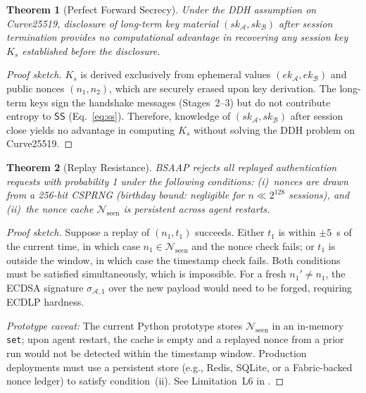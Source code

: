 \documentclass[review,5p,twocolumn,times]{elsarticle}
\newtheorem{theorem}{Theorem}[section]
\begin{document}
\begin{theorem}[Perfect Forward Secrecy]\label{thm:pfs}
Under the DDH assumption on Curve25519, disclosure of long-term key material
$(sk_\mathcal{A}, sk_\mathcal{B})$ after session termination provides no
computational advantage in recovering any session key $K_s$ established
before the disclosure.
\end{theorem}

\begin{proof}[Proof sketch]
$K_s$ is derived exclusively from ephemeral values $(ek_\mathcal{A},
ek_\mathcal{B})$ and public nonces $(n_1, n_2)$, which are securely erased
upon key derivation. The long-term keys sign the handshake messages
(Stages~2--3) but do not contribute entropy to $\mathsf{SS}$
(Eq.~\ref{eq:ss}). Therefore, knowledge of $(sk_\mathcal{A}, sk_\mathcal{B})$
after session close yields no advantage in computing $K_s$ without solving
the DDH problem on Curve25519.
\end{proof}

\begin{theorem}[Replay Resistance]\label{thm:replay}
BSAAP rejects all replayed authentication requests with probability 1 under
the following conditions: \emph{(i)}~nonces are drawn from a 256-bit CSPRNG
(birthday bound: negligible for $n \ll 2^{128}$ sessions), and
\emph{(ii)}~the nonce cache $\mathcal{N}_{\mathrm{seen}}$ is persistent
across agent restarts.
\end{theorem}

\begin{proof}[Proof sketch]
Suppose a replay of $(n_1, t_1)$ succeeds. Either $t_1$ is within
$\pm 5$~s of the current time, in which case
$n_1 \in \mathcal{N}_{\mathrm{seen}}$ and the nonce check fails;
or $t_1$ is outside the window, in which case the timestamp check fails.
Both conditions must be satisfied simultaneously, which is impossible.
For a fresh $n_1' \neq n_1$, the ECDSA signature $\sigma_{\mathcal{A},1}$
over the new payload would need to be forged, requiring ECDLP hardness.

\emph{Prototype caveat:} The current Python prototype stores
$\mathcal{N}_{\mathrm{seen}}$ in an in-memory \texttt{set}; upon agent
restart, the cache is empty and a replayed nonce from a prior run would
not be detected within the timestamp window. Production deployments must
use a persistent store (e.g., Redis, SQLite, or a Fabric-backed nonce
ledger) to satisfy condition~(ii). See Limitation~L6 in .

\end{proof}
\end{document}
